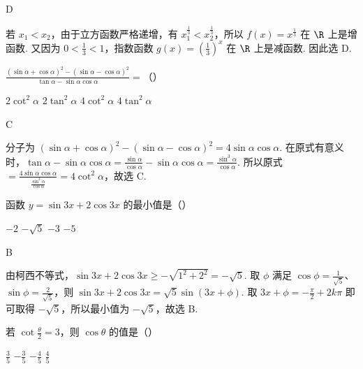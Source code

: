 \documentclass[UTF8,a4paper,oneside,11pt]{ctexbook}
\begin{document}
\begin{answer}D\end{answer}

\begin{solution}
若 \(x_{1}<x_{2}\)，由于立方函数严格递增，有 \(x_{1}^{\frac{1}{3}}<x_{2}^{\frac{1}{3}}\)，所以 \(f(x)=x^{\frac{1}{3}}\) 在 \(\R\) 上是增函数. 又因为 \(0<\frac13<1\)，指数函数 \(g(x)=\left(\frac13\right)^{x}\) 在 \(\R\) 上是减函数. 因此选 D.
\end{solution}

\begin{problem}
\(\displaystyle\frac{(\sin\alpha+\cos\alpha)^{2}-(\sin\alpha-\cos\alpha)^{2}}{\tan\alpha-\sin\alpha\cos\alpha}=\)（\quad）

\choices
{\(2\cot^{2}\alpha\)}
{\(2\tan^{2}\alpha\)}
{\(4\cot^{2}\alpha\)}
{\(4\tan^{2}\alpha\)}
\end{problem}

\begin{answer}C\end{answer}

\begin{solution}
分子为 \((\sin\alpha+\cos\alpha)^{2}-(\sin\alpha-\cos\alpha)^{2}=4\sin\alpha\cos\alpha\). 在原式有意义时，\(\tan\alpha-\sin\alpha\cos\alpha=\frac{\sin\alpha}{\cos\alpha}-\sin\alpha\cos\alpha=\frac{\sin^{3}\alpha}{\cos\alpha}\). 所以原式 \(=\frac{4\sin\alpha\cos\alpha}{\frac{\sin^{3}\alpha}{\cos\alpha}}=4\cot^{2}\alpha\)，故选 C.
\end{solution}

\begin{problem}
函数 \(y=\sin3x+2\cos3x\) 的最小值是（\quad）

\choices
{\(-2\)}
{\(-\sqrt5\)}
{\(-3\)}
{\(-5\)}
\end{problem}

\begin{answer}B\end{answer}

\begin{solution}
由柯西不等式，\(\sin3x+2\cos3x\geqslant-\sqrt{1^{2}+2^{2}}=-\sqrt5\). 取 \(\phi\) 满足 \(\cos\phi=\frac1{\sqrt5}\)、\(\sin\phi=\frac2{\sqrt5}\)，则
\(\sin3x+2\cos3x=\sqrt5\sin(3x+\phi)\). 取 \(3x+\phi=-\frac\pi2+2k\pi\) 即可取得 \(-\sqrt5\)，所以最小值为 \(-\sqrt5\)，故选 B.
\end{solution}

\begin{problem}
若 \(\cot\frac{\theta}{2}=3\)，则 \(\cos\theta\) 的值是（\quad）

\choices
{\(\frac35\)}
{\(-\frac35\)}
{\(-\frac45\)}
{\(\frac45\)}
\end{problem}
\end{document}
